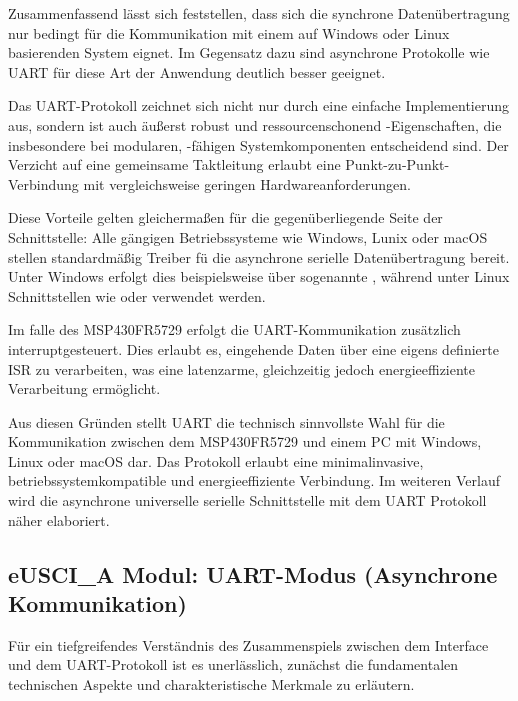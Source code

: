Zusammenfassend lässt sich feststellen, dass sich die synchrone Datenübertragung nur bedingt für die Kommunikation mit einem auf Windows oder Linux basierenden System eignet. Im Gegensatz dazu sind asynchrone Protokolle wie UART f\"ur diese Art der Anwendung deutlich besser geeignet. 

Das UART-Protokoll zeichnet sich nicht nur durch eine einfache Implementierung aus, sondern ist auch \"au{\ss}erst robust und ressourcenschonend -Eigenschaften, die insbesondere bei modularen, -f\"ahigen Systemkomponenten entscheidend sind. Der Verzicht auf eine gemeinsame Taktleitung erlaubt eine Punkt-zu-Punkt-Verbindung mit vergleichsweise geringen Hardwareanforderungen. 

Diese Vorteile gelten gleicherma{\ss}en f\"ur die gegen\"uberliegende Seite der Schnittstelle: Alle g\"angigen Betriebssysteme wie Windows, Lunix oder macOS stellen standardm\"aßig Treiber f\"u die asynchrone serielle Daten\"ubertragung bereit. Unter Windows erfolgt dies beispielsweise \"uber sogenannte , w\"ahrend unter Linux Schnittstellen wie  oder  verwendet werden.

Im falle des MSP430FR5729 erfolgt die UART-Kommunikation zus\"atzlich interruptgesteuert. Dies erlaubt es, eingehende Daten \"uber eine eigens definierte ISR zu verarbeiten, was eine latenzarme, gleichzeitig jedoch energieeffiziente Verarbeitung erm\"oglicht.

Aus diesen Gr\"unden stellt UART die technisch sinnvollste Wahl für die Kommunikation zwischen dem MSP430FR5729 und einem PC mit Windows, Linux oder macOS dar. Das Protokoll erlaubt eine minimalinvasive, betriebssystemkompatible und energieeffiziente Verbindung. Im weiteren Verlauf wird die asynchrone universelle serielle Schnittstelle mit dem UART Protokoll n\"aher elaboriert.\AI

\subsection{eUSCI\_A Modul: UART-Modus (Asynchrone Kommunikation)}
\label{eUSCI_UART}

F\"ur ein tiefgreifendes Verst\"andnis des Zusammenspiels zwischen dem Interface und dem UART-Protokoll ist es unerl\"asslich, zun\"achst die fundamentalen technischen Aspekte und charakteristische Merkmale zu erl\"autern.

